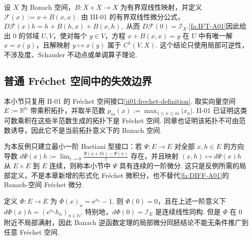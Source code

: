 \begin{FAApplication}[有界二次非线性方程]
设 \(\displaystyle X\) 为 Banach 空间，\(\displaystyle B:X\times X\to X\) 为有界双线性映射，并定义
\(\displaystyle \mathcal F(x) := x+B(x,x).\)
由 III-01 的有界双线性微分公式，
\(\displaystyle D\mathcal F(x)h = h+B(h,x)+B(x,h),\)
从而 \(\displaystyle D\mathcal F(0)=\mathcal I_X\).\autoref{fa:IFT-A01}因此给出 \(\displaystyle0\) 的邻域 \(\displaystyle U,V\)，使对每个 \(\displaystyle y\in V\)，方程
\(\displaystyle x+B(x,x)=y\)
在 \(\displaystyle U\) 中有唯一解 \(\displaystyle x=x(y)\)，且解映射 \(\displaystyle y\mapsto x(y)\) 属于 \(\displaystyle C^1(V,X)\). 这个结论只使用局部可逆性，不涉及度、Schauder 不动点或单调算子理论.
\end{FAApplication}

\subsection{普通 Fréchet 空间中的失效边界}

本小节只复用 II-01 的 Fréchet 空间接口\autoref{ii01:frechet-definition}. 取实向量空间
\(\displaystyle E:=\mathbb R^{\mathbb N}\)
带乘积拓扑，并取半范数
\(\displaystyle p_m(x) := \max_{1\leqslant n\leqslant m}|x_n|.\)
II-01 已证明这类可数乘积在这些半范数生成的拓扑下是 Fréchet 空间. 同章也证明该拓扑不可由范数诱导，因此它不是当前拓扑意义下的 Banach 空间.

为本反例只建立最小一阶 Bastiani 型接口：若 \(\displaystyle\Psi:E\to E\) 对全部 \(\displaystyle x,h\in E\) 的方向导数
\(\displaystyle d\Psi(x)h := \lim_{t\to0} \frac{\Psi(x+th)-\Psi(x)}{t}\)
存在，并且映射 \(\displaystyle(x,h)\mapsto d\Psi(x)h\) 从 \(\displaystyle E\times E\) 到 \(\displaystyle E\) 连续，则称本小节中 \(\displaystyle\Psi\) 具有连续的一阶微分. 这只是反例所需的局部定义，不是本章新增的形式化 Fréchet 微积分，也不替代\autoref{fa:DIFF-A01}的 Banach-空间 Fréchet 微分.

\begin{FACounterexample}
定义 \(\displaystyle\Phi:E\to E\) 为
\(\displaystyle \Phi(x)_n = \mathrm{e}^{x_n}-1.\)
则 \(\displaystyle\Phi(0)=0\)，且在上述一阶意义下
\(\displaystyle d\Phi(x)h = (\mathrm{e}^{x_n}h_n)_{n\in\mathbb N}.\)
特别地，\(\displaystyle d\Phi(0)=\mathcal I_E\) 是连续线性同构. 但是 \(\displaystyle\Phi\) 在 \(\displaystyle0\) 附近不局部满射，因此 Banach 逆函数定理的局部微分同胚结论不能无条件推广到任意 Fréchet 空间.
\end{FACounterexample}

